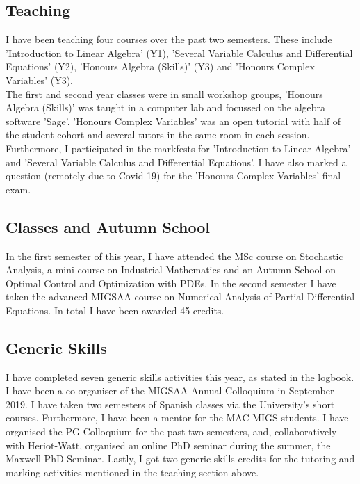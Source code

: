 \documentclass[11pt, a4paper]{article}
\theoremstyle{definition}
\begin{document}
\subsection{Teaching}
I have been teaching four courses over the past two semesters. These include 'Introduction to Linear Algebra' (Y1), 'Several Variable Calculus and Differential Equations' (Y2), 'Honours Algebra (Skills)' (Y3) and 'Honours Complex Variables' (Y3).\\
The first and second year classes were in small workshop groups, 'Honours Algebra (Skills)' was taught in a computer lab and focussed on the algebra software 'Sage'. 'Honours Complex Variables' was an open tutorial with half of the student cohort and several tutors in the same room in each session.\\
Furthermore, I participated in the markfests for 'Introduction to Linear Algebra' and 'Several Variable Calculus and Differential Equations'. I have also marked a question (remotely due to Covid-19) for the 'Honours Complex Variables' final exam.
\subsection{Classes and Autumn School}
In the first semester of this year, I have attended the MSc course on Stochastic Analysis, a mini-course on Industrial Mathematics and an Autumn School on Optimal Control and Optimization with PDEs. In the second semester I have taken the advanced MIGSAA course on Numerical Analysis of Partial Differential Equations. In total I have been awarded 45 credits.
\subsection{Generic Skills}
I have completed seven generic skills activities this year, as stated in the logbook. I have been a co-organiser of the MIGSAA Annual Colloquium in September 2019. I have taken two semesters of Spanish classes via the University's short courses. Furthermore, I have been a mentor for the MAC-MIGS students. I have organised the PG Colloquium for the past two semesters, and, collaboratively with Heriot-Watt, organised an online PhD seminar during the summer, the Maxwell PhD Seminar.
Lastly, I got two generic skills credits for the tutoring and marking activities mentioned in the teaching section above.
\end{document}
